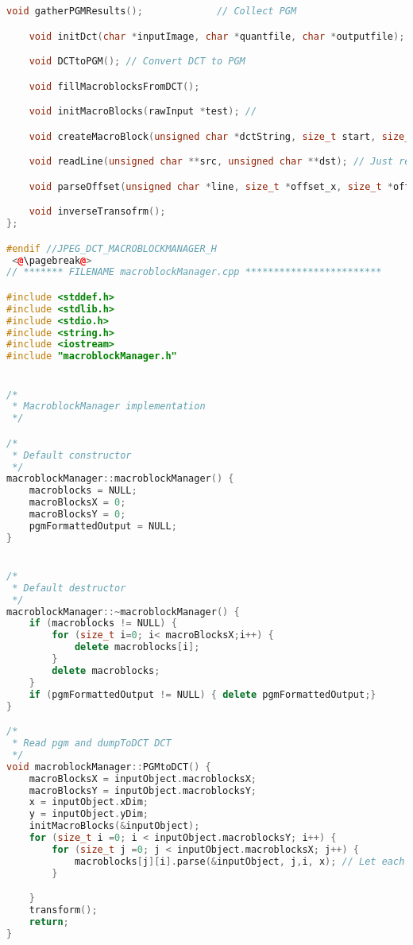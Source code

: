 \documentclass{report}
\begin{document}
\begin{lstlisting}[language=C++]
    void gatherPGMResults();             // Collect PGM

    void initDct(char *inputImage, char *quantfile, char *outputfile); // Initialize data needed for DCT->PGM transformation

    void DCTtoPGM(); // Convert DCT to PGM

    void fillMacroblocksFromDCT();

    void initMacroBlocks(rawInput *test); //

    void createMacroBlock(unsigned char *dctString, size_t start, size_t anEnd); // Create macroblock from PGM

    void readLine(unsigned char **src, unsigned char **dst); // Just read line, will advance src to the end of the line

    void parseOffset(unsigned char *line, size_t *offset_x, size_t *offset_y); // Read offset from beginning of a block in DCT formatted string

    void inverseTransofrm();
};

#endif //JPEG_DCT_MACROBLOCKMANAGER_H
 <@\pagebreak@>
// ******* FILENAME macroblockManager.cpp ************************

#include <stddef.h>
#include <stdlib.h>
#include <stdio.h>
#include <string.h>
#include <iostream>
#include "macroblockManager.h"


/*
 * MacroblockManager implementation
 */

/*
 * Default constructor
 */
macroblockManager::macroblockManager() {
    macroblocks = NULL;
    macroBlocksX = 0;
    macroBlocksY = 0;
    pgmFormattedOutput = NULL;
}


/*
 * Default destructor
 */
macroblockManager::~macroblockManager() {
    if (macroblocks != NULL) {
        for (size_t i=0; i< macroBlocksX;i++) {
            delete macroblocks[i];
        }
        delete macroblocks;
    }
    if (pgmFormattedOutput != NULL) { delete pgmFormattedOutput;}
}

/*
 * Read pgm and dumpToDCT DCT
 */
void macroblockManager::PGMtoDCT() {
    macroBlocksX = inputObject.macroblocksX;
    macroBlocksY = inputObject.macroblocksY;
    x = inputObject.xDim;
    y = inputObject.yDim;
    initMacroBlocks(&inputObject);
    for (size_t i =0; i < inputObject.macroblocksY; i++) {
        for (size_t j =0; j < inputObject.macroblocksX; j++) {
            macroblocks[j][i].parse(&inputObject, j,i, x); // Let each macroblock to parsePGM it's own part
        }

    }
    transform();
    return;
}


\end{lstlisting}
\end{document}
